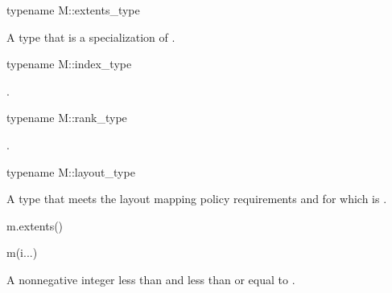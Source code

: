 \begin{itemdecl}
typename M::extents_type
\end{itemdecl}

\begin{itemdescr}
\pnum
\result
A type that is a specialization of .
\end{itemdescr}

\begin{itemdecl}
typename M::index_type
\end{itemdecl}

\begin{itemdescr}
\pnum
\result
{}.
\end{itemdescr}

\begin{itemdecl}
typename M::rank_type
\end{itemdecl}

\begin{itemdescr}
\pnum
\result
{}.
\end{itemdescr}

\begin{itemdecl}
typename M::layout_type
\end{itemdecl}

\begin{itemdescr}
\pnum
\result
A type  that meets
the layout mapping policy requirements and
for which  is .
\end{itemdescr}

\begin{itemdecl}
m.extents()
\end{itemdecl}

\begin{itemdescr}
\pnum
\result
{}
\end{itemdescr}

\begin{itemdecl}
m(i...)
\end{itemdecl}

\begin{itemdescr}
\pnum
\result
{}

\pnum
\returns
A nonnegative integer
less than  and
less than or equal to .
\end{itemdescr}


